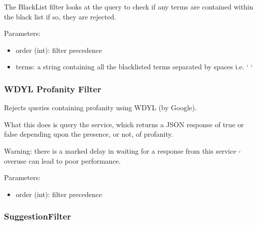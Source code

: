 \documentclass[letterpaper,10pt,english]{sphinxmanual}
\begin{document}
\begin{fulllineitems}
\label{api3.0:puppy.query.filter.BlackListFilter}
The BlackList filter looks at the query to check if any terms are contained within the black list if so, they are rejected.

Parameters:
\begin{itemize}
\item {} 
order (int): filter precedence

\item {} 
terms: a string containing all the blacklisted terms separated by spaces i.e. ` `

\end{itemize}

\end{fulllineitems}



\subsubsection{WDYL Profanity Filter}
\label{api3.0:wdyl-profanity-filter}

\begin{fulllineitems}
\label{api3.0:puppy.query.filter.WdylProfanityQueryFilter}
Rejects queries containing profanity using WDYL (by Google).

What this does is query the service, which returns a JSON response of true or false depending upon the presence, or not, of profanity.

Warning: there is a marked delay in waiting for a response from this service - overuse can lead to poor performance.

Parameters:
\begin{itemize}
\item {} 
order (int): filter precedence

\end{itemize}

\end{fulllineitems}



\subsubsection{SuggestionFilter}
\label{api3.0:suggestionfilter}
\end{document}
